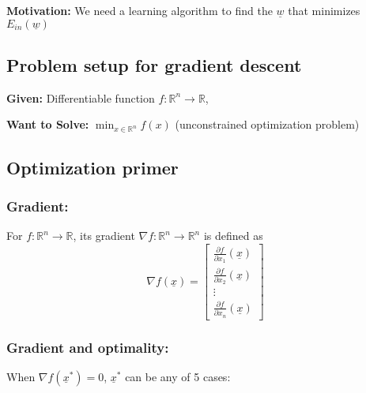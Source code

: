 \textbf{Motivation:} We need a learning algorithm to find the $\underline{w}$ that minimizes $E_{in} (\underline{w})$

\subsection{Problem setup for gradient descent}
\begin{intuition}
    \textbf{Given:} Differentiable function $f: \mathbb{R}^n \to \mathbb{R}$, 
    \vspace{1em}

    \textbf{Want to Solve:} $\min_{x \in \mathbb{R}^n} f(x)$ (unconstrained optimization problem)
\end{intuition}

\subsection{Optimization primer}
    \subsubsection{Gradient:}
    \begin{definition}
        For $f: \mathbb{R}^n \to \mathbb{R}$, its gradient $\nabla f: \mathbb{R}^n \to \mathbb{R}^n$ is defined as
            \[
            \nabla f(\underline{x}) =
            \begin{bmatrix}
            \frac{\partial f}{\partial x_1}(\underline{x}) \\
            \frac{\partial f}{\partial x_2}(\underline{x}) \\
            \vdots \\
            \frac{\partial f}{\partial x_n}(\underline{x})
            \end{bmatrix}
            \]
    \end{definition}

    \begin{example}
    \end{example}

    \subsubsection{Gradient and optimality:}
    \begin{definition}
        When $\nabla f(\underline{x}^*) = 0$, $\underline{x}^*$ can be any of 5 cases:

    \end{definition}

